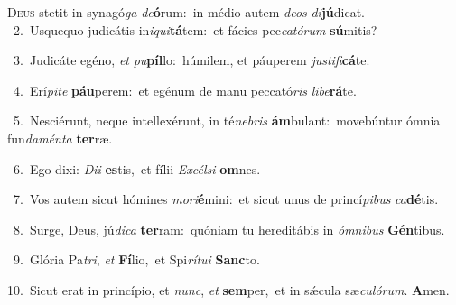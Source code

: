\lettrine{\initial\textcolor{\initialcolor}{D}}{eus} stetit in synagó\textit{ga} \textit{de}\-\textbf{ó}rum:~\star in médio autem \textit{de}\-\textit{os} \textit{di}\-\textbf{jú}dicat.\\
{\numbfont\textcolor{\numbcolor}{~2.}}~Usquequo judicátis in\-\textit{i}\-\textit{qui}\textbf{tá}tem:~\star et fácies pec\-\textit{ca}\-\textit{tó}\textit{rum} \textbf{sú}\-mitis?\par
{\numbfont\textcolor{\numbcolor}{~3.}}~Judicáte egéno, \textit{et} \textit{pu}\-\textbf{píl}lo:~\star húmilem, et páuperem \textit{jus}\-\textit{ti}\textit{fi}\textbf{cá}te.\par
{\numbfont\textcolor{\numbcolor}{~4.}}~Erí\-\textit{pi}\-\textit{te} \textbf{páu}\-perem:~\star et egénum de manu peccató\textit{ris} \textit{li}\-\textit{be}\textbf{rá}te.\par
{\numbfont\textcolor{\numbcolor}{~5.}}~Nesciérunt, neque intellexérunt, in té\-\textit{ne}\-\textit{bris} \textbf{ám}\-bulant:~\star movebúntur ómnia fun\-\textit{da}\-\textit{mén}\textit{ta} \textbf{ter}\-ræ.\par
{\numbfont\textcolor{\numbcolor}{~6.}}~Ego dixi: \textit{Di}\-\textit{i} \textbf{es}\-tis,~\star et fílii \textit{Ex}\-\textit{cél}\textit{si} \textbf{om}\-nes.\par
{\numbfont\textcolor{\numbcolor}{~7.}}~Vos autem sicut hómines \textit{mo}\-\textit{ri}\textbf{é}mini:~\star et sicut unus de princí\-\textit{pi}\-\textit{bus} \textit{ca}\-\textbf{dé}tis.\par
{\numbfont\textcolor{\numbcolor}{~8.}}~Surge, Deus, jú\-\textit{di}\-\textit{ca} \textbf{ter}\-ram:~\star quóniam tu hereditábis in \textit{óm}\-\textit{ni}\textit{bus} \textbf{Gén}\-tibus.\par
{\numbfont\textcolor{\numbcolor}{~9.}}~Glória Pa\-\textit{tri}\-, \textit{et} \textbf{Fí}\-lio,~\star et Spi\-\textit{rí}\-\textit{tu}\textit{i} \textbf{Sanc}\-to.\par
{\numbfont\textcolor{\numbcolor}{10.}}~Sicut erat in princípio, et \textit{nunc}\-, \textit{et} \textbf{sem}\-per,~\star et in sǽcula sæ\-\textit{cu}\-\textit{ló}\textit{rum}. \textbf{A}\-men.\par
